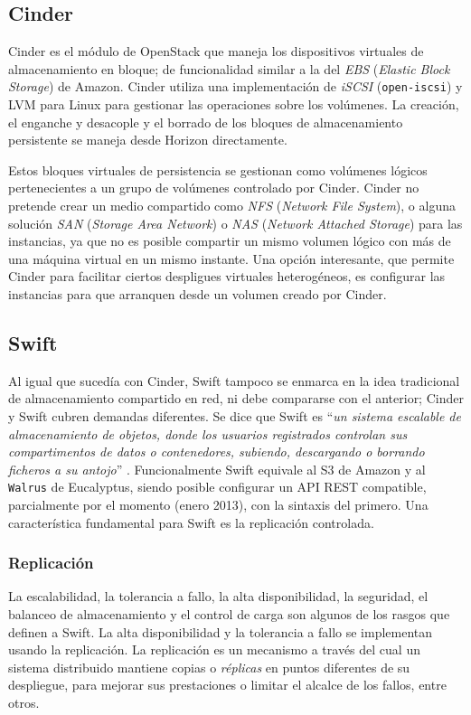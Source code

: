 \subsection{Cinder}\label{subsec:cinder}
\noindent Cinder es el m\'odulo de OpenStack que maneja los dispositivos virtuales de almacenamiento en bloque; de funcionalidad similar a la del \emph{EBS} (\emph{Elastic Block Storage}) de Amazon. Cinder utiliza una implementaci\'on de \emph{iSCSI} (\texttt{open-iscsi}) y LVM para Linux para gestionar las operaciones sobre los vol\'umenes. La creaci\'on, el enganche y desacople y el borrado de los bloques de almacenamiento persistente se maneja desde Horizon directamente.\newline

Estos bloques virtuales de persistencia se gestionan como vol\'umenes l\'ogicos pertenecientes a un grupo de vol\'umenes controlado por Cinder. Cinder no pretende crear un medio compartido como \emph{NFS} (\emph{Network File System}), o alguna soluci\'on \emph{SAN} (\emph{Storage Area Network}) o \emph{NAS} (\emph{Network Attached Storage}) para las instancias, ya que no es posible compartir un mismo vo\-lu\-men l\'ogico con m\'as de una m\'aquina virtual en un mismo instante. Una opci\'on interesante, que permite Cinder para facilitar ciertos despligues virtuales heterog\'eneos, es configurar las instancias para que arranquen desde un volumen creado por Cinder.


\subsection{Swift}\label{subsec:swift}
\noindent Al igual que suced\'ia con Cinder, Swift tampoco se enmarca en la idea tradicional de almacenamiento compartido en red, ni debe compararse con el anterior; Cinder y Swift cubren demandas diferentes. Se dice que Swift es ``\textit{un sistema escalable de almacenamiento de objetos, donde los usuarios registrados controlan sus compartimentos de datos o contenedores, subiendo, descargando o borrando ficheros a su antojo}'' \cite{osswift}. Funcionalmente Swift equivale al S3 de Amazon y al \texttt{Walrus} de Eucalyptus, siendo posible con\-fi\-gu\-rar un API REST compatible, parcialmente por el momento (enero 2013), con la sintaxis del primero. Una caracter\'istica fundamental para Swift es la replicaci\'on controlada.


\subsubsection{Replicaci\'on}\label{subsubsec:replicacion}
\noindent La escalabilidad, la tolerancia a fallo, la alta disponibilidad, la seguridad, el balanceo de almacenamiento y el control de carga son algunos de los rasgos que definen a Swift. La alta disponibilidad y la tolerancia a fallo se implementan usando la replicaci\'on. La replicaci\'on es un mecanismo a trav\'es del cual un sistema distribuido mantiene copias o \emph{r\'eplicas} en puntos diferentes de su despliegue, para mejorar sus prestaciones o limitar el alcalce de los fallos, entre otros.\newline

